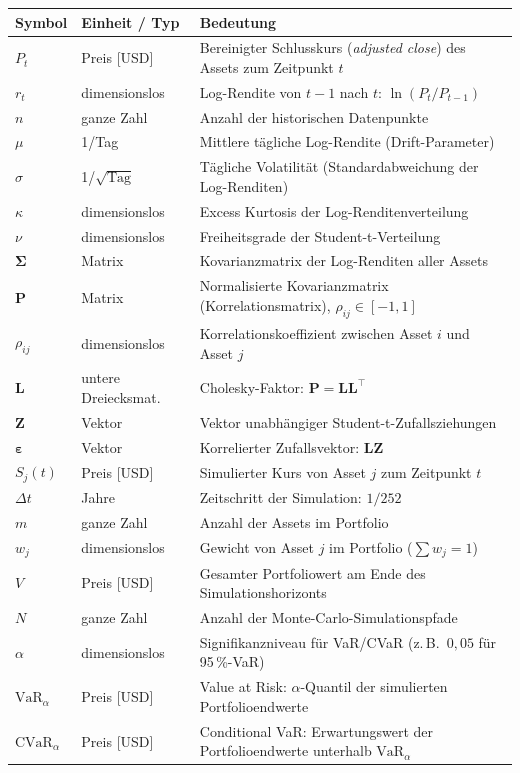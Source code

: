 \documentclass[12pt, a4paper]{article}
\begin{document}
\renewcommand{\arraystretch}{1.4}
\begin{tabular}{>{\bfseries}p{2.5cm} p{3.5cm} p{8cm}}
    \toprule
    \textbf{Symbol} & \textbf{Einheit / Typ} & \textbf{Bedeutung} \\
    \midrule
    $P_t$       & Preis [USD]         & Bereinigter Schlusskurs (\emph{adjusted close}) des Assets zum Zeitpunkt $t$ \\
    $r_t$       & dimensionslos       & Log-Rendite von $t-1$ nach $t$: $\ln(P_t / P_{t-1})$ \\
    $n$         & ganze Zahl          & Anzahl der historischen Datenpunkte \\
    $\mu$       & 1/Tag               & Mittlere tägliche Log-Rendite (Drift-Parameter) \\
    $\sigma$    & 1/$\sqrt{\text{Tag}}$ & Tägliche Volatilität (Standardabweichung der Log-Renditen) \\
    $\kappa$    & dimensionslos       & Excess Kurtosis der Log-Renditenverteilung \\
    $\nu$       & dimensionslos       & Freiheitsgrade der Student-t-Verteilung \\
    $\boldsymbol{\Sigma}$ & Matrix    & Kovarianzmatrix der Log-Renditen aller Assets \\
    $\mathbf{P}$ & Matrix             & Normalisierte Kovarianzmatrix (Korrelationsmatrix), $\rho_{ij} \in [-1,1]$ \\
    $\rho_{ij}$ & dimensionslos       & Korrelationskoeffizient zwischen Asset $i$ und Asset $j$ \\
    $\mathbf{L}$ & untere Dreiecksmat.& Cholesky-Faktor: $\mathbf{P} = \mathbf{L}\mathbf{L}^\top$ \\
    $\mathbf{Z}$ & Vektor             & Vektor unabhängiger Student-t-Zufallsziehungen \\
    $\boldsymbol{\varepsilon}$ & Vektor & Korrelierter Zufallsvektor: $\mathbf{L}\mathbf{Z}$ \\
    $S_j(t)$    & Preis [USD]         & Simulierter Kurs von Asset $j$ zum Zeitpunkt $t$ \\
    $\Delta t$  & Jahre               & Zeitschritt der Simulation: $1/252$ \\
    $m$         & ganze Zahl          & Anzahl der Assets im Portfolio \\
    $w_j$       & dimensionslos       & Gewicht von Asset $j$ im Portfolio ($\sum w_j = 1$) \\
    $V$         & Preis [USD]         & Gesamter Portfoliowert am Ende des Simulationshorizonts \\
    $N$         & ganze Zahl          & Anzahl der Monte-Carlo-Simulationspfade \\
    $\alpha$    & dimensionslos       & Signifikanzniveau für VaR/CVaR (z.\,B.\ $0{,}05$ für 95\,\%-VaR) \\
    $\text{VaR}_\alpha$ & Preis [USD] & Value at Risk: $\alpha$-Quantil der simulierten Portfolioendwerte \\
    $\text{CVaR}_\alpha$ & Preis [USD] & Conditional VaR: Erwartungswert der Portfolioendwerte unterhalb $\text{VaR}_\alpha$ \\
    \bottomrule
\end{tabular}
\end{document}
